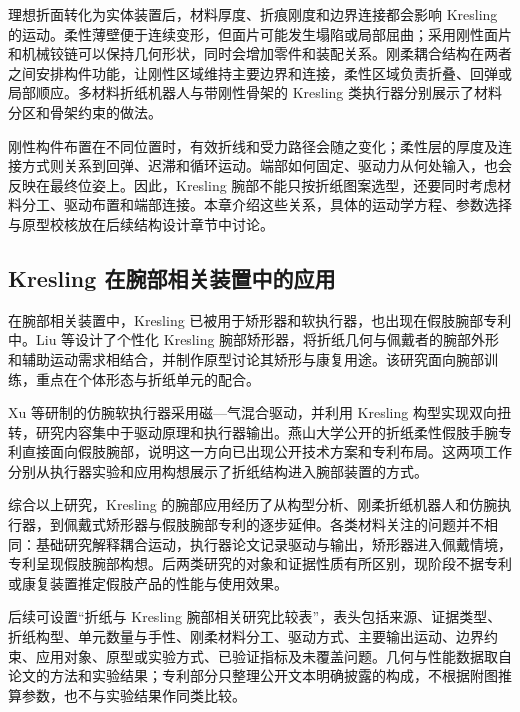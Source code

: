 
理想折面转化为实体装置后，材料厚度、折痕刚度和边界连接都会影响 Kresling 的运动。柔性薄壁便于连续变形，但面片可能发生塌陷或局部屈曲；采用刚性面片和机械铰链可以保持几何形状，同时会增加零件和装配关系。刚柔耦合结构在两者之间安排构件功能，让刚性区域维持主要边界和连接，柔性区域负责折叠、回弹或局部顺应。多材料折纸机器人与带刚性骨架的 Kresling 类执行器分别展示了材料分区和骨架约束的做法\cite{Xue2024RigidFlexibleOrigami,Tang2024KreslingRigidSkeleton}。

刚性构件布置在不同位置时，有效折线和受力路径会随之变化；柔性层的厚度及连接方式则关系到回弹、迟滞和循环运动。端部如何固定、驱动力从何处输入，也会反映在最终位姿上。因此，Kresling 腕部不能只按折纸图案选型，还要同时考虑材料分工、驱动布置和端部连接。本章介绍这些关系，具体的运动学方程、参数选择与原型校核放在后续结构设计章节中讨论。

\subsection{Kresling 在腕部相关装置中的应用}

在腕部相关装置中，Kresling 已被用于矫形器和软执行器，也出现在假肢腕部专利中。Liu 等设计了个性化 Kresling 腕部矫形器，将折纸几何与佩戴者的腕部外形和辅助运动需求相结合，并制作原型讨论其矫形与康复用途\cite{Liu2025KreslingWristOrthosis}。该研究面向腕部训练，重点在个体形态与折纸单元的配合。

Xu 等研制的仿腕软执行器采用磁—气混合驱动，并利用 Kresling 构型实现双向扭转，研究内容集中于驱动原理和执行器输出\cite{Xu2024WristInspiredKresling}。燕山大学公开的折纸柔性假肢手腕专利直接面向假肢腕部，说明这一方向已出现公开技术方案和专利布局\cite{Yanshan2026OrigamiProstheticWristPatent}。这两项工作分别从执行器实验和应用构想展示了折纸结构进入腕部装置的方式。


综合以上研究，Kresling 的腕部应用经历了从构型分析、刚柔折纸机器人和仿腕执行器，到佩戴式矫形器与假肢腕部专利的逐步延伸。各类材料关注的问题并不相同：基础研究解释耦合运动，执行器论文记录驱动与输出，矫形器进入佩戴情境，专利呈现假肢腕部构想。后两类研究的对象和证据性质有所区别，现阶段不据专利或康复装置推定假肢产品的性能与使用效果。

后续可设置“折纸与 Kresling 腕部相关研究比较表”，表头包括来源、证据类型、折纸构型、单元数量与手性、刚柔材料分工、驱动方式、主要输出运动、边界约束、应用对象、原型或实验方式、已验证指标及未覆盖问题。几何与性能数据取自论文的方法和实验结果；专利部分只整理公开文本明确披露的构成，不根据附图推算参数，也不与实验结果作同类比较。

